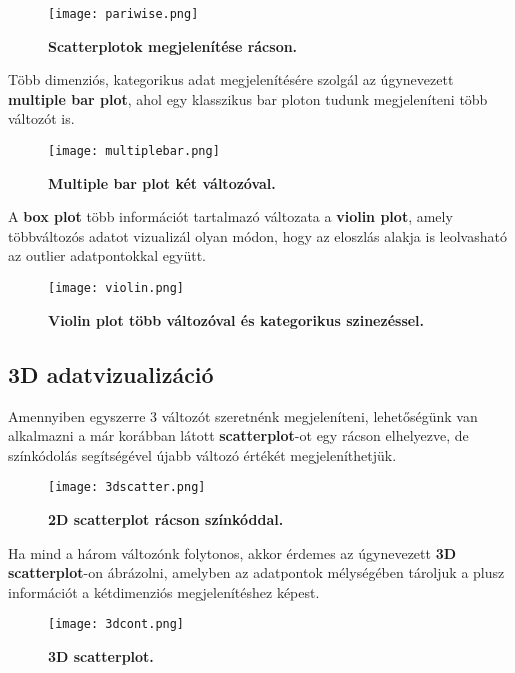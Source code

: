 \documentclass[12pt]{extarticle}
\begin{document}
 \begin{figure}[H]
    \centering
    \texttt{[image: pariwise.png]}
    \caption{\textbf{Scatterplotok megjelenítése rácson.}}
    \label{fig:GeneralDiagram}
 \end{figure}
 
Több dimenziós, kategorikus adat megjelenítésére szolgál az úgynevezett \textbf{multiple bar plot}, ahol egy klasszikus bar ploton tudunk megjeleníteni több változót is.

\begin{figure}[H]
    \centering
    \texttt{[image: multiplebar.png]}
    \caption{\textbf{Multiple bar plot két változóval.}}
    \label{fig:GeneralDiagram}
 \end{figure}

A \textbf{box plot} több információt tartalmazó változata a \textbf{violin plot}, amely többváltozós adatot vizualizál olyan módon, hogy az eloszlás alakja is leolvasható az outlier adatpontokkal együtt.


\begin{figure}[H]
    \centering
    \texttt{[image: violin.png]}
    \caption{\textbf{Violin plot több változóval és kategorikus szinezéssel.}}
    \label{fig:GeneralDiagram}
 \end{figure}


\subsection{3D adatvizualizáció}
Amennyiben egyszerre 3 változót szeretnénk megjeleníteni, lehetőségünk van alkalmazni a már korábban látott \textbf{scatterplot}-ot egy rácson elhelyezve, de színkódolás segítségével újabb változó értékét megjeleníthetjük.

\begin{figure}[H]
    \centering
    \texttt{[image: 3dscatter.png]}
    \caption{\textbf{2D scatterplot rácson színkóddal.}}
    \label{fig:GeneralDiagram}
 \end{figure}
 
 Ha mind a három változónk folytonos, akkor érdemes az úgynevezett \textbf{3D scatterplot}-on ábrázolni, amelyben az adatpontok mélységében tároljuk a plusz információt a kétdimenziós megjelenítéshez képest.
 
 \begin{figure}[H]
    \centering
    \texttt{[image: 3dcont.png]}
    \caption{\textbf{3D scatterplot.}}
    \label{fig:GeneralDiagram}
 \end{figure}
\end{document}
